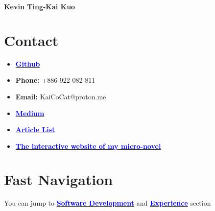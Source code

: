 \documentclass[11pt]{article}
\begin{document}
\begin{center}
    \LARGE \textbf{Kevin Ting-Kai Kuo}
\end{center}

\vspace{1em}

\begin{multicols*}{2}
    





\section*{Contact}
{\footnotesize
\begin{itemize}[noitemsep]
    \item \href{https://github.com/Kuo-TingKai}{\textbf{\textcolor{blue}{Github}}}
    \item \textbf{Phone:} +886-922-082-811
    \item \textbf{Email:} KaiCoCat@proton.me
    \item \href{https://medium.com/@nehsm30126}{\textbf{\textcolor{blue}{Medium}}} 
    \item \href{https://www.overleaf.com/read/xzdtxtgxtnby#49163b}{\textbf{\textcolor{blue}{Article List}}}
    \item \href{https://github.com/Kuo-TingKai/theorem-dream}{\textbf{\textcolor{blue}{The interactive website of my micro-novel}}}
\end{itemize}
}

\section*{Fast Navigation}
You can jump to \href{#software-dev}{\textbf{\textcolor{blue}{Software Development}}} and \href{#experience}{\textbf{\textcolor{blue}{Experience}}} section\\


\end{multicols*}
\end{document}
